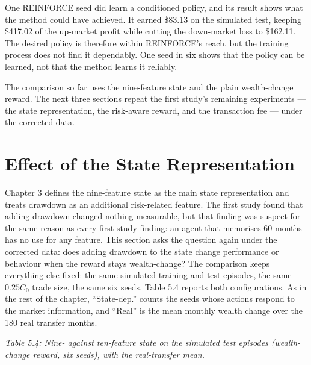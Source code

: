 One REINFORCE seed did learn a conditioned policy, and its result shows
what the method could have achieved. It earned \$83.13 on the simulated
test, keeping \$417.02 of the up-market profit while cutting the
down-market loss to \$162.11. The desired policy is therefore within
REINFORCE's reach, but the training process does not find it dependably.
One seed in six shows that the policy can be learned, not that the
method learns it reliably.

The comparison so far uses the nine-feature state and the plain
wealth-change reward. The next three sections repeat the first study's
remaining experiments --- the state representation, the risk-aware
reward, and the transaction fee --- under the corrected data.

\section{Effect of the State Representation}

Chapter 3 defines the nine-feature state as the main state
representation and treats drawdown as an additional risk-related
feature. The first study found that adding drawdown changed nothing
measurable, but that finding was suspect for the same reason as every
first-study finding: an agent that memorises 60 months has no use for any
feature. This section asks the question again under the corrected data:
does adding drawdown to the state change performance or behaviour when
the reward stays wealth-change? The comparison keeps everything else
fixed: the same simulated training and test episodes, the same
\(0.25C_{0}\) trade size, the same six seeds. Table 5.4 reports both
configurations. As in the rest of the chapter, ``State-dep.'' counts the
seeds whose actions respond to the market information, and ``Real'' is
the mean monthly wealth change over the 180 real transfer months.

\emph{Table 5.4: Nine- against ten-feature state on the simulated test
episodes (wealth-change reward, six seeds), with the real-transfer
mean.}

